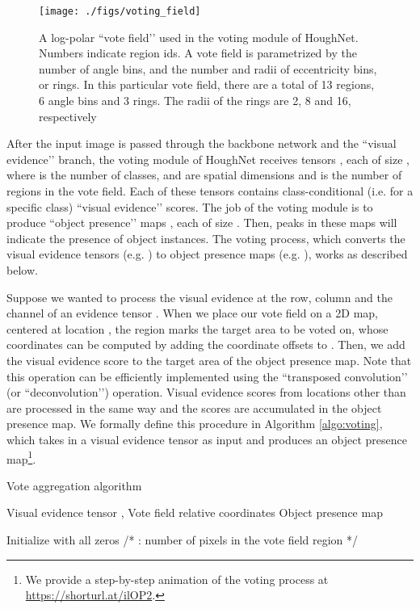 \documentclass[runningheads]{llncs}
\begin{document}
\setlength\intextsep{0pt}
\begin{wrapfigure}[22]{r}{0.4\textwidth}
\texttt{[image: ./figs/voting\_field]}
\centering
\caption{A log-polar ``vote field’’ used in the voting module of HoughNet. Numbers indicate region ids. A vote field is parametrized by the number of angle bins, and the number and radii of eccentricity bins, or rings. In this particular vote field, there are a total of 13 regions, 6 angle bins and 3 rings. The radii of the rings are 2, 8 and 16, respectively
}
\label{fig:vf}
\end{wrapfigure}


After the  input image is passed through the backbone network and the ``visual evidence’’ branch, the voting module of HoughNet receives  tensors , each of size  , where  is the number of classes,  and  are spatial dimensions and  is the number of regions in the vote field. Each of these tensors contains class-conditional (i.e. for a specific class) ``visual evidence’’ scores. The job of the voting module is to produce  ``object presence’’ maps , each of size . Then, peaks in these maps will indicate the presence of object instances. The voting process, which converts the visual evidence tensors (e.g. ) to object presence maps (e.g. ), works as described below. 








Suppose we wanted to process the visual evidence at the  row,  column and the  channel of an evidence tensor . When we place our vote field on a 2D map, centered at location , the region  marks the target area to be voted on, whose coordinates can be computed by adding the coordinate offsets  to . Then, we add the visual evidence score  to the target area of the object presence map. Note that this operation can be efficiently implemented using the ``transposed convolution’’ (or ``deconvolution’’) operation. Visual evidence scores from locations other than  are processed in the same way and the scores are accumulated in the object presence map. We formally define this procedure in Algorithm \ref{algo:voting}, which takes in a visual evidence tensor as input and produces an object presence map\footnote{We provide a step-by-step animation of the voting process at \url{https://shorturl.at/ilOP2}.}. 




\setlength\intextsep{8mm}
\begin{algorithm}
\caption{Vote aggregation algorithm}
\label{algo:voting}
\begin{algorithmic}
\REQUIRE Visual evidence tensor , Vote field relative coordinates 
\ENSURE Object presence map  


\STATE Initialize  with all zeros
\STATE /*  : number of pixels in the vote field region  */
\STATE  
\STATE 
\ENDFOR
\ENDFOR
\end{algorithmic}
\end{algorithm}
\end{document}
